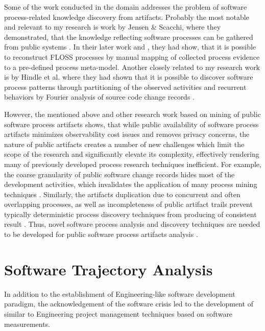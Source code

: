 Some of the work conducted in the domain addresses the problem of software process-related 
knowledge discovery from artifacts. Probably the most notable and relevant to 
my research is work by Jensen \& Scacchi, where they demonstrated, that the knowledge
reflecting software processes can be gathered from public systems \cite{citeulike:12550640}. 
In their later work\cite{citeulike:5043664} and \cite{citeulike:5128808}, they had show, that it is possible to 
reconstruct FLOSS processes by manual mapping of collected process evidence 
to a pre-defined process meta-model. 
Another closely related to my research work is by Hindle et al. where they had shown that it is possible to 
discover software process patterns through partitioning of the observed activities \cite{citeulike:10377366} 
and recurrent behaviors by Fourier analysis of source code change records \cite{citeulike:10377345}.

However, the mentioned above and other research work based on mining of public software process artifacts shows, 
that while public availability of software process artifacts minimizes observability cost issues and removes privacy concerns, 
the nature of public artifacts creates a number of new challenges which limit the scope of the research and 
significantly elevate its complexity, effectively rendering many of previously developed process research techniques 
inefficient. 
For example, the coarse granularity of public software change records hides most of the development activities, 
which invalidates the application of many process mining techniques \cite{citeulike:10377366} \cite{citeulike:2678511}.
Similarly, the artifacts duplication due to concurrent and often overlapping processes, as well as incompleteness of 
public artifact trails prevent typically deterministic process discovery techniques from producing of consistent 
result \cite{citeulike:2678511}.
Thus, novel software process analysis and discovery techniques are needed to be developed for public software 
process artifacts analysis \cite{citeulike:7853299}.

%
%
\section{Software Trajectory Analysis}\label{section_software_trajectory}
In addition to the establishment of Engineering-like software development paradigm, the acknowledgement of 
the software crisis led to the development of similar to Engineering project management techniques based on 
software measurements.


